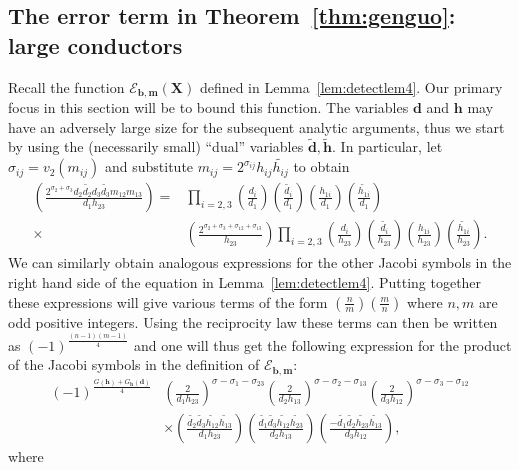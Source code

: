 \documentclass[a4paper,12pt,reqno]{amsart}
\numberwithin{equation}{section} \numberwithin{figure}{section}
\renewcommand{\l}{\left}
\renewcommand{\r}{\right}
\renewcommand{\b}{\mathbf}
\renewcommand{\c}{\mathcal}
\renewcommand{\#}{\sharp}
\theoremstyle{definition}
\numberwithin{lemma}{section}
\begin{document}
\subsection{The error term in Theorem~\ref{thm:genguo}: large conductors}
 \label{s:largecond} Recall the function $\c E_{\b b , \b m }(\b X)$ defined 
in Lemma~\ref{lem:detectlem4}. Our primary focus in this section will be to bound 
this function. The variables $\b d $ and $\b h $  may have an adversely large size for the subsequent analytic arguments, thus
we start by using  the (necessarily   small)  ``dual'' variables $\widetilde{\b d}, \widetilde{\b h }$.
In particular,   let  $  \sigma_{ij}=v_2( m_{ij} )$ and substitute 
  $m_{ij}=2^{\sigma_{ij} } h_{ij } \widetilde{h_{ij}}$ to
obtain
\begin{align*}
\l( \frac{2^{\sigma_2+\sigma_3}d_2 \widetilde{ d_2} d_3 \widetilde{ d_3}    m_{12}  m_{13}   }{d_1 h_{23} }\r) 
=& 
 \prod_{i=2,3} 
\l( \frac{ d_i   }{d_1   }\r) 
\l( \frac{ \widetilde{ d_i}    }{d_1   }\r) 
\l( \frac{ h_{1i }    }{d_1   }\r) 
\l( \frac{ \widetilde{ h_{1i }    }    }{d_1   }\r) 
\\
\times  
& \l( \frac{ 2^{\sigma_2+\sigma_3 + \sigma_{12}  +\sigma_{13}  } } {h_{23}    }\r)  
\prod_{i=2,3} 
\l( \frac{ d_i   }{h_{23}     }\r) 
\l( \frac{ \widetilde{ d_i}    }{h_{23}   }\r) 
\l( \frac{ h_{1i }    }{h_{23}    }\r) 
\l( \frac{ \widetilde{ h_{1i }    }    }{h_{23}    }\r) 
.\end{align*} We can similarly obtain analogous expressions for the other Jacobi symbols in the right hand side of the equation  
in Lemma~\ref{lem:detectlem4}.
Putting together these expressions will give various terms of the form $(\frac{n}{m})(\frac{m}{n})$
where $n, m$   are  odd positive integers. Using the  reciprocity law these terms can then be written as $(-1)^{\frac{(n-1)(m-1)  }{4}} $
and one will thus get the following expression for the 
product of the   Jacobi symbols in the definition of $\c E_{\b b , \b m }$:
\begin{align*}
(-1)^{\frac{G(\b h ) + G_{\b h }(\b d )  }{4}}
& \l(\frac{2}{d_1 h_{23} } \r)^{\sigma-\sigma_1-\sigma_{23} }
\l(\frac{2}{d_2 h_{13} } \r)^{\sigma-\sigma_2-\sigma_{13} }
\l(\frac{2}{d_3 h_{12} } \r)^{\sigma-\sigma_3-\sigma_{12} }
\\ 
&
\times \l( \frac{  \widetilde{d_2}   \widetilde{d_3}  \widetilde{ h_{12} }   \widetilde{  h_{13}  }  }{d_1 h_{23} }\r) 
\l( \frac{  \widetilde{d_1}   \widetilde{d_3}  \widetilde{ h_{12} }   \widetilde{  h_{23}  }  }{d_2 h_{13} }\r) 
\l( \frac{ - \widetilde{d_1}   \widetilde{d_2}  \widetilde{ h_{23} }   \widetilde{  h_{13}  }  }{d_3 h_{12} }\r) 
,\end{align*}    where 
\end{document}
